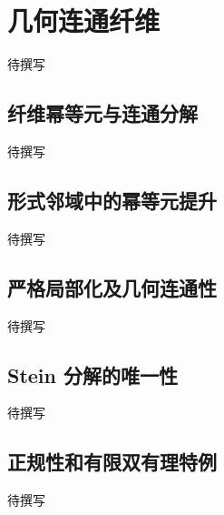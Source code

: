 
% 
% 
% 

\section{几何连通纤维}
\label{g5:sec:2104}

待撰写

\subsection{纤维幂等元与连通分解}
\label{g5:subsec:2104:01}
待撰写

\subsection{形式邻域中的幂等元提升}
\label{g5:subsec:2104:02}
待撰写

\subsection{严格局部化及几何连通性}
\label{g5:subsec:2104:03}
待撰写

\subsection{Stein 分解的唯一性}
\label{g5:subsec:2104:04}
待撰写

\subsection{正规性和有限双有理特例}
\label{g5:subsec:2104:05}
待撰写
